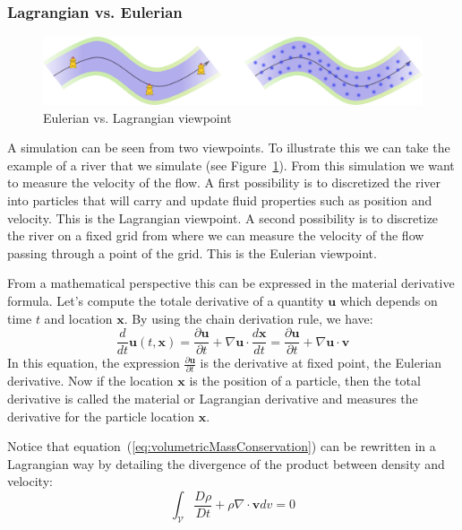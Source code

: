 \subsubsection{Lagrangian vs. Eulerian}

\begin{figure}[!ht]
\centering
\includegraphics[scale=0.5]{images/continuum_mechanics/eulerianVsLagrangian.png}
\caption[STAR mechanics: Eulerian vs. Lagrangian]{\label{fig:eulerianVsLagrangian} Eulerian vs. Lagrangian viewpoint}
\end{figure}

A simulation can be seen from two viewpoints. To illustrate this we can take the example of a river that we simulate (see Figure~\ref{fig:eulerianVsLagrangian}). From this simulation we want to measure the velocity of the flow. A first possibility is to discretized the river into particles that will carry and update fluid properties such as position and velocity. This is the Lagrangian viewpoint. A second possibility is to discretize the river on a fixed grid from where we can measure the velocity of the flow passing through a point of the grid. This is the Eulerian viewpoint.

From a mathematical perspective this can be expressed in the material derivative formula. Let's compute the totale derivative of a quantity $\mathbf{u}$ which depends on time $t$ and location $\mathbf{x}$. By using the chain derivation rule, we have:
\begin{equation}
\frac{d}{dt}\mathbf{u}(t,\mathbf{x}) = 
\frac{\partial \mathbf{u}}{\partial t} + \nabla \mathbf{u} \cdot \frac{d\mathbf{x}}{dt} =
\frac{\partial \mathbf{u}}{\partial t} + \nabla \mathbf{u} \cdot \mathbf{v} 
\end{equation}
In this equation, the expression $\frac{\partial \mathbf{u}}{\partial t}$ is the derivative at fixed point, the Eulerian derivative. Now if the location $\mathbf{x}$ is the position of a particle, then the total derivative is called the material or Lagrangian derivative and measures the derivative for the particle location $\mathbf{x}$.

Notice that equation~(\ref{eq:volumetricMassConservation}) can be rewritten in a Lagrangian way by detailing the divergence of the product between density and velocity:
\begin{equation}
\label{eq:lagrangianMassConservation}
\int_{\mathcal{V}} \frac{D\rho}{Dt} + \rho \nabla \cdot \mathbf{v} dv = 0
\end{equation}

